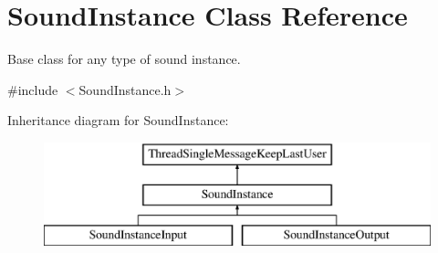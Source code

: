 \hypertarget{class_sound_instance}{
\section{SoundInstance Class Reference}
\label{class_sound_instance}
}


Base class for any type of sound instance.  




{\ttfamily \#include $<$SoundInstance.h$>$}

Inheritance diagram for SoundInstance:\begin{figure}[H]
\begin{center}
\leavevmode
\includegraphics[height=3.000000cm]{class_sound_instance}
\end{center}
\end{figure}
